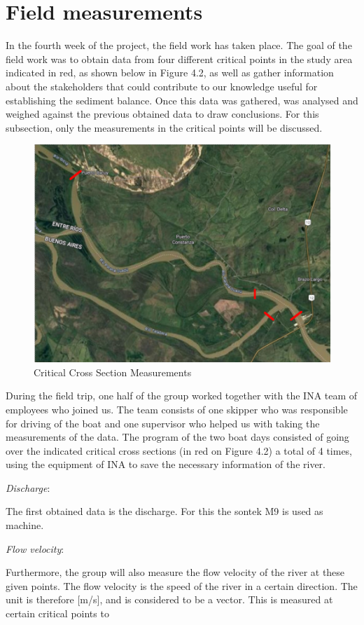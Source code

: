 \section{Field measurements}
In the fourth week of the project, the field work has taken place. The goal of the field work was to obtain data from four different critical points in the study area indicated in red, as shown below in Figure 4.2, as well as gather information about the stakeholders that could contribute to our knowledge useful for establishing the sediment balance. Once this data was gathered, was analysed and weighed against the previous obtained data to draw conclusions. For this subsection, only the measurements in the critical points will be discussed.
\begin{figure}[H]
    \centering
    \includegraphics[width=0.5\linewidth]{figures/ch4/Critical measurement points.png}
    \caption{Critical Cross Section Measurements}
    \label{fig:fieldwork cross sections}
\end{figure}
During the field trip, one half of the group worked together with the INA team of employees who joined us. The team consists of one skipper who was responsible for driving of the boat and one supervisor who helped us with taking the measurements of the data.
The program of the two boat days consisted of going over the indicated critical cross sections (in red on Figure 4.2) a total of 4 times, using the equipment of INA to save the necessary information of the river.

\textit{Discharge}:

The first obtained data is the discharge. For this the sontek M9 is used as machine.

\textit{Flow velocity}:

Furthermore, the group will also measure the flow velocity of the river at these given points. The flow velocity is the speed of the river in a certain direction. The unit is therefore  [m/s], and is considered to be a vector. This is measured at certain critical points to 

